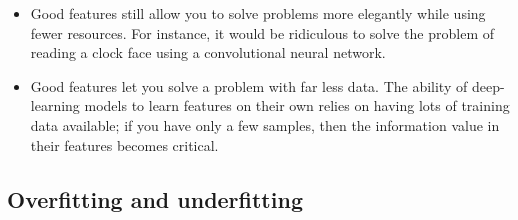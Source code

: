 \documentclass{article}
\numberwithin{equation}{section} %
\begin{document}
\begin{itemize}
	\item Good features still allow you to solve problems more elegantly while using fewer resources. For instance, it would be ridiculous to solve the problem of reading a clock face using a convolutional neural network.
	\item Good features let you solve a problem with far less data. The ability of deep-learning models to learn features on their own relies on having lots of training data available; if you have only a few samples, then the information value in their features becomes critical.
\end{itemize}


\subsection{ Overfitting and underfitting}
\end{document}
